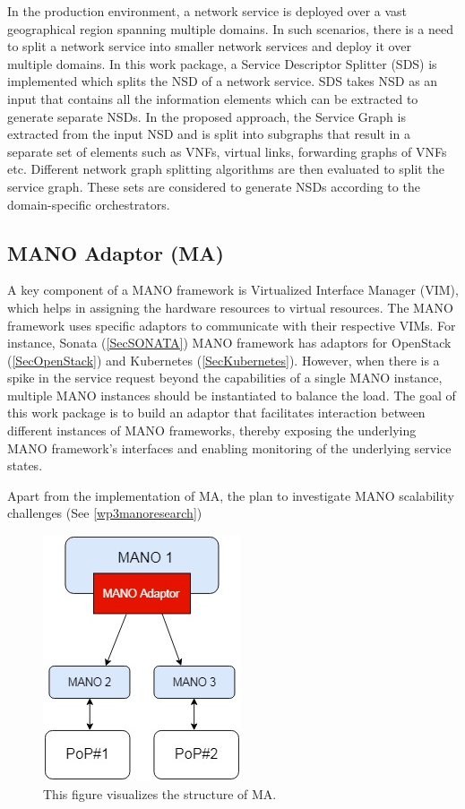 In the production environment, a network service is deployed over a vast geographical region spanning multiple domains. In such scenarios, there is a need to split a network service into smaller network services and deploy it over multiple domains. In this work package, a Service Descriptor Splitter (SDS) is implemented which splits the NSD of a network service. SDS takes NSD as an input that contains all the information elements which can be extracted to generate separate NSDs. In the proposed approach, the Service Graph is extracted from the input NSD and is split into subgraphs that result in a separate set of elements such as VNFs, virtual links, forwarding graphs of VNFs etc. Different network graph splitting algorithms are then evaluated to split the service graph. These sets are considered to generate NSDs according to the domain-specific orchestrators.


\subsection{MANO Adaptor (MA)}

A key component of a MANO framework is Virtualized Interface Manager (VIM),  which helps in assigning the hardware resources to virtual resources. The MANO framework uses specific adaptors to communicate with their respective VIMs. For instance, Sonata  (\ref{SecSONATA}) MANO framework has adaptors for OpenStack (\ref{SecOpenStack}) and Kubernetes (\ref{SecKubernetes}). However, when there is a spike in the service request beyond the capabilities of a single MANO instance, multiple MANO instances should be instantiated to balance the load. The goal of this work package is to build an adaptor that facilitates interaction between different instances of MANO frameworks, thereby exposing the underlying MANO framework's interfaces and enabling monitoring of the underlying service states.

Apart from the implementation of MA, the plan to investigate MANO scalability challenges (See \ref{wp3manoresearch})

\begin{figure}[h]
	\centering
	\includegraphics[width=0.29\linewidth]{figures/Structure2}
	\caption{This figure visualizes the structure of MA. }
	\label{fig:structure2}
\end{figure}

